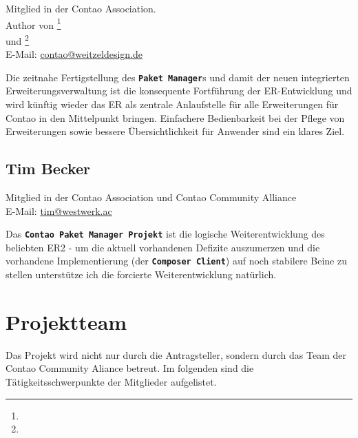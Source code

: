 \documentclass[
paper=a4,
draft=false,%
fontsize=10pt%
]{scrartcl}
\newcommand{\contaoPackageManagerProject}{\textbf{\texttt{Contao Paket Manager Projekt}}}
\newcommand{\packageManager}{\textbf{\texttt{Paket Manager}}}
\newcommand{\composerClient}{\textbf{\texttt{Composer Client}}}
\begin{document}
Mitglied in der Contao Association.\\
Author von \footnote{} \\
und \footnote{} \\
E-Mail: \href{mailto:contao@weitzeldesign.de}{contao@weitzeldesign.de}

\begin{emquote}{}
Die zeitnahe Fertigstellung des \packageManager{}s und damit der neuen integrierten Erweiterungsverwaltung ist die konsequente Fortführung der ER-Entwicklung und wird künftig wieder das ER als zentrale Anlaufstelle für alle Erweiterungen für Contao in den Mittelpunkt bringen. Einfachere Bedienbarkeit bei der Pflege von Erweiterungen sowie bessere Übersichtlichkeit für Anwender sind ein klares Ziel.
\end{emquote}

\subsection*{Tim  Becker}

Mitglied in der Contao Association und Contao Community Alliance \\
E-Mail: \href{mailto:tim@westwerk.ac}{tim@westwerk.ac}

\begin{emquote}{}
Das \contaoPackageManagerProject{} ist die logische Weiterentwicklung des beliebten ER2 - um die aktuell vorhandenen Defizite auszumerzen und die vorhandene Implementierung (der \composerClient{}) auf noch stabilere Beine zu stellen unterstütze ich die forcierte Weiterentwicklung natürlich.
\end{emquote}

\newpage

%
%

\section{Projektteam}
\label{sec:team}

Das Projekt wird nicht nur durch die Antragsteller, sondern durch das Team der Contao Community Aliance betreut. Im folgenden sind die Tätigkeitsschwerpunkte der Mitglieder aufgelistet.
\end{document}
